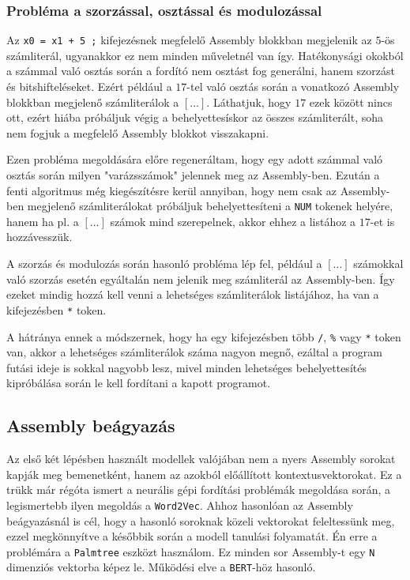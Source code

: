 \subsubsection{Probléma a szorzással, osztással és modulozással}
Az \texttt{x0 = x1 + 5 ;} kifejezésnek megfelelő Assembly blokkban 
megjelenik az $5$-ös számliterál, ugyanakkor ez nem minden műveletnél van így.
Hatékonysági okokból a számmal való osztás során a fordító nem osztást fog
generálni, hanem szorzást és bitshifteléseket. Ezért például a $17$-tel való
osztás során a vonatkozó Assembly blokkban megjelenő számliterálok a $[...]$.
Láthatjuk, hogy $17$ ezek között nincs ott, ezért hiába próbáljuk végig
a behelyettesískor az összes számliterált, soha nem fogjuk a megfelelő Assembly
blokkot visszakapni.

Ezen probléma megoldására előre regeneráltam, hogy egy adott számmal való
osztás során milyen "varázsszámok" jelennek meg az Assembly-ben. Ezután a fenti
algoritmus még kiegészítésre kerül annyiban, hogy nem csak az Assembly-ben
megjelenő számliterálokat próbáljuk behelyettesíteni a \texttt{NUM} tokenek
helyére, hanem ha pl. a $[...]$ számok mind szerepelnek, akkor ehhez a listához
a $17$-et is hozzávesszük.

A szorzás és modulozás során hasonló probléma lép fel, például a $[...]$
számokkal való szorzás esetén egyáltalán nem jelenik meg számliterál az
Assembly-ben. Így ezeket mindig hozzá kell venni a lehetséges számliterálok
listájához, ha van a kifejezésben \texttt{*} token.

A hátránya ennek a módszernek, hogy ha egy kifejezésben több \texttt{/},
\texttt{\%} vagy \texttt{*} token van, akkor a lehetséges számliterálok száma
nagyon megnő, ezáltal a program futási ideje is sokkal nagyobb lesz, mivel
minden lehetséges behelyettesítés kipróbálása során le kell fordítani
a kapott programot.

\subsection{Assembly beágyazás}
Az első két lépésben használt modellek valójában nem a nyers Assembly sorokat
kapják meg bemenetként, hanem az azokból előállított kontextusvektorokat. Ez
a trükk már régóta ismert a neurális gépi fordítási problémák megoldása során,
a legismertebb ilyen megoldás a \texttt{Word2Vec}\cite{??}. Ahhoz hasonlóan az
Assembly beágyazásnál is cél, hogy a hasonló soroknak közeli vektorokat
feleltessünk meg, ezzel megkönnyítve a későbbik során a modell tanulási
folyamatát. Én erre a problémára a \texttt{Palmtree}\cite{palmtree} eszközt használom. Ez
minden sor Assembly-t egy \texttt{N} dimenziós vektorba képez le. Működési elve
a \texttt{BERT}\cite{??}-höz hasonló.
